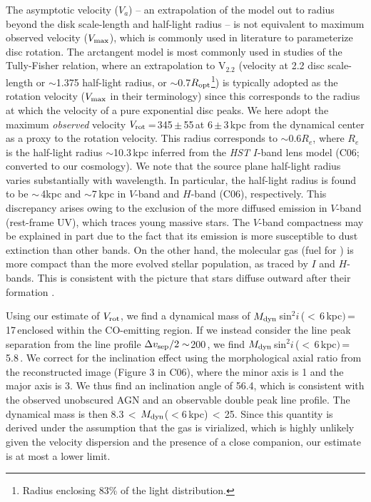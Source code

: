 \documentclass[]{emulateapj}
\begin{document}
The asymptotic velocity ($V_{a}$) -- an extrapolation of the model
out to radius beyond the disk scale-length and half-light radius --
is not equivalent to maximum observed velocity ($V_{\rm max}$),
which is commonly used in literature to parameterize disc rotation.
The arctangent model is most commonly used in studies of the
Tully-Fisher relation, where an extrapolation to V$_{2.2}$ (velocity
at 2.2 disc scale-length or $\sim$1.375 half-light radius,
or $\sim$0.7$R_{\rm opt}$\footnote{Radius enclosing 83\% of the light
distribution.}) is typically adopted
as the rotation velocity ($V_{\rm max}$ in their
terminology) since this corresponds to the radius at which the velocity
of a pure exponential disc peaks.
We here adopt the maximum {\em observed} velocity
$V_{\rm rot}$\,=\,345\,$\pm$\,55\,\kms at 6\,$\pm$\,3\,kpc from the %
dynamical center as a proxy to the rotation velocity.
This radius corresponds to $\sim$0.6$R_e$, where $R_e$ is the half-light
radius $\sim$10.3\,kpc inferred from the {\it HST} $I$-band
lens model (C06; converted to
our cosmology).
We note that the source plane half-light radius varies substantially with
wavelength. In particular, the half-light radius is found to be
$\sim$\,4kpc and $\sim$7\,kpc in $V$-band
\citep{Brewer08a} and $H$-band (C06), respectively.
This discrepancy arises owing to the exclusion of the more
diffused emission in $V$-band (rest-frame UV),
which traces young massive stars.
The $V$-band compactness may be explained in part
due to the fact that its emission is
more susceptible to dust extinction than other bands.
On the other hand, the molecular gas (fuel for \SF) is more compact
than the more evolved stellar population, as traced by $I$ and $H$-bands.
This is consistent with the picture that stars diffuse outward
after their formation \citep{Calzetti01a}.

Using our estimate of $V_{\rm rot}$, we find a dynamical mass of
$M_{\rm dyn}$\,sin$^2 i$\,($<$\,6\,kpc$)$\,=\,17\,\Msun enclosed
within the CO-emitting region. If we instead consider the
line peak separation from the
\bco line profile $\Delta v_{\rm sep}/2 \sim$200\,\kms, we find
$M_{\rm dyn}$\,sin$^2 i$\,($<$\,6\,kpc$)$\,=\,5.8\,\Msun.
We correct for the inclination effect using the
morphological axial ratio from the reconstructed image (Figure 3 in C06), where
the minor axis is 1 and the major axis is 3.
We thus find an inclination angle of 56.4\degr, which is consistent with the
observed unobscured AGN and an observable double peak line profile.
The dynamical mass is then
8.3\Msun\,$<$\,$M_{\rm dyn}$($<$6\,kpc)\,$<$\,25\Msun.
Since this quantity is derived under the assumption that the gas is
virialized, which is highly unlikely given the velocity dispersion and the
presence of a close companion, our estimate is
at most a lower limit.
\end{document}
